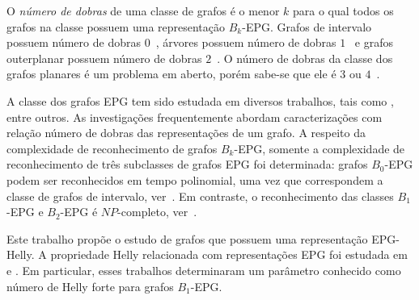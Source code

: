 O \emph{número de dobras} de uma classe de grafos é o menor  $k$ para o qual todos os grafos na classe possuem uma representação $B_k$-EPG. Grafos de intervalo possuem número de dobras $0$~\cite{golumbic2009}, árvores possuem  número de dobras $1$~\cite{golumbic2009} e  grafos outerplanar possuem número de dobras $2$~\cite{daniel2014b}. O número de dobras da classe dos grafos planares é um problema em aberto, porém sabe-se que ele é $ 3 $ ou $4$~\cite{daniel2014b}. %

A classe dos grafos EPG tem sido estudada em diversos trabalhos, tais como  \cite{alcon2016, Asinowski2009, cohen2014, golumbic2009, heldt2014,  martin2017}, entre outros. As investigações frequentemente abordam caracterizações com relação número de dobras das representações de um grafo. A respeito da complexidade de reconhecimento de grafos $B_k$-EPG, somente a complexidade de reconhecimento de três subclasses de grafos EPG foi determinada:
 grafos $B_0$-EPG podem ser reconhecidos em tempo polinomial, uma vez que correspondem a classe de grafos de intervalo, ver~\cite{booth1976, golumbic2009}. Em contraste, o reconhecimento das classes $B_1$-EPG e $B_2$-EPG é $NP$-completo, ver~\cite{heldt2014, martin2017}.







Este trabalho propõe o estudo de grafos que possuem uma representação EPG-Helly. 
A propriedade Helly relacionada com representações EPG foi  estudada em~\cite{golumbic2009} e \cite{golumbic2013}. Em particular, esses trabalhos determinaram um parâmetro conhecido como número de Helly forte  para grafos $B_1$-EPG. 

